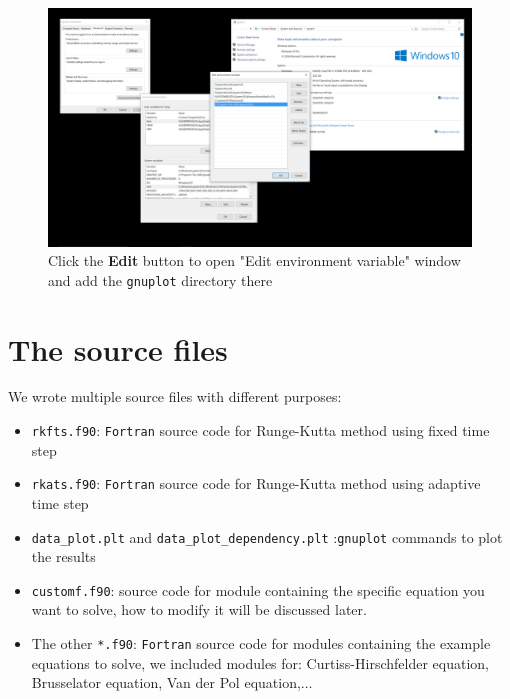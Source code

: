 \documentclass{article}
\begin{document}
	\begin{figure}[H]
		\centering	\includegraphics[width=15cm]{figextra5}
		\caption{Click the \textbf{Edit} button to open "Edit environment variable" window and add the \texttt{gnuplot} directory there}
	\end{figure}
	\section{The source files}\label{section2}
	We wrote multiple source files with different purposes:
	\begin{itemize}
		\item \texttt{rkfts.f90}: \texttt{Fortran} source code for Runge-Kutta method using fixed time step
		\item \texttt{rkats.f90}: \texttt{Fortran} source code for Runge-Kutta method using adaptive time step
		\item \texttt{data\_plot.plt} and \texttt{data\_plot\_dependency.plt} :\texttt{gnuplot} commands to plot the results
		\item \texttt{customf.f90}: source code for module containing the specific equation you want to solve, how to modify it will be discussed later.
		\item The other \texttt{*.f90}: \texttt{Fortran} source code for modules containing the example equations to solve, we included modules for: Curtiss-Hirschfelder equation, Brusselator equation, Van der Pol equation,$\dots$
	\end{itemize}
\end{document}
